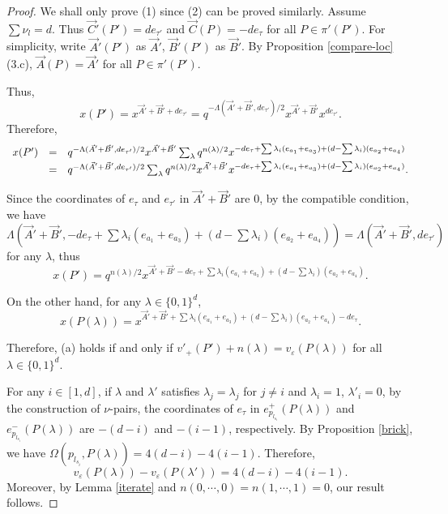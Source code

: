 \documentclass[10pt]{amsart}
\theoremstyle{theorems}
\begin{document}
\begin{proof}

We shall only prove (1) since (2) can be proved similarly. Assume $\sum\nu_l=d$. Thus $\vec{C}'(P')=de_{\tau'}$ and $\vec{C}(P)=-de_{\tau}$ for all $P\in \pi'(P')$. For simplicity, write $\vec{A}'(P')$ as $\vec{A}'$, $\vec{B}'(P')$ as $\vec{B}'$. By Proposition \ref{compare-loc} (3.c), $\vec{A}(P)=\vec{A}'$ for all $P\in \pi'(P')$.

Thus,
$$x(P')=x^{\vec{A}'+\vec{B}'+de_{\tau'}}=q^{-\Lambda(\vec{A}'+\vec{B}',de_{\tau'})/2}x^{\vec{A}'+\vec{B}'}x^{de_{\tau'}}.$$
Therefore,
$$
\begin{array}{rcl} x(P')

& = & q^{-\Lambda(\vec{A}'+\vec{B}',de_{\tau'})/2}x^{\vec{A}'+\vec{B}'}\textstyle\sum_{\lambda}
q^{n(\lambda)/2}x^{-de_{\tau}+\sum\lambda_i(e_{a_1}+e_{a_3})+(d-\sum\lambda_i)(e_{a_2}+e_{a_4})} \vspace{2pt} \\

& = & q^{-\Lambda(\vec{A}'+\vec{B}',de_{\tau'})/2} \textstyle\sum_{\lambda}
q^{n(\lambda)/2}x^{\vec{A}'+\vec{B}'} x^{-de_{\tau}+\sum\lambda_i(e_{a_1}+e_{a_3})+(d-\sum\lambda_i)(e_{a_2}+e_{a_4})}.\\
\end{array}$$

Since the coordinates of $e_\tau$ and $e_{\tau'}$ in $\vec{A}'+\vec{B}'$ are 0, by the compatible condition, we have $\Lambda(\vec{A}'+\vec{B}', -de_{\tau}+\sum\lambda_i(e_{a_1}+e_{a_3})+(d-\sum\lambda_i)(e_{a_2}+e_{a_4}))=\Lambda(\vec{A}'+\vec{B}',de_{\tau'})$ for any $\lambda$, thus
$$x(P')=q^{n(\lambda)/2}x^{\vec{A}'+\vec{B}'-de_{\tau}+\sum\lambda_i(e_{a_1}+e_{a_3})+(d-\sum\lambda_i)(e_{a_2}+e_{a_4})}.$$

On the other hand, for any $\lambda\in \{0,1\}^d$,
$$ x(P(\lambda))=x^{\vec{A}'+\vec{B}'+\sum\lambda_i(e_{a_1}+e_{a_3})+(d-\sum\lambda_i)(e_{a_2}+e_{a_4})-de_{\tau}}.$$

Therefore, (a) holds if and only if $v'_{+}(P')+n(\lambda)=v_{\varepsilon}(P(\lambda))$ for all $\lambda\in \{0,1\}^{d}$.

For any $i\in [1,d]$, if $\lambda$ and $\lambda'$ satisfies $\lambda_j=\lambda_j$ for $j\neq i$ and $\lambda_i=1$, $\lambda'_i=0$, by the construction of $\nu$-pairs, the coordinates of $e_{\tau}$ in $e^{+}_{p_{l_{s_i}}}(P(\lambda))$ and $e^{-}_{p_{l_{s_i}}}(P(\lambda))$ are $-(d-i)$ and $-(i-1)$, respectively. By Proposition \ref{brick}, we have $\Omega(p_{l_{s_i}},P(\lambda))=4(d-i)-4(i-1)$. Therefore, $$v_{\varepsilon}(P(\lambda))-v_{\varepsilon}(P(\lambda'))=4(d-i)-4(i-1).$$
Moreover, by Lemma \ref{iterate} and $n(0,\cdots,0)=n(1,\cdots,1)=0$, our result follows.
\end{proof}
\end{document}
